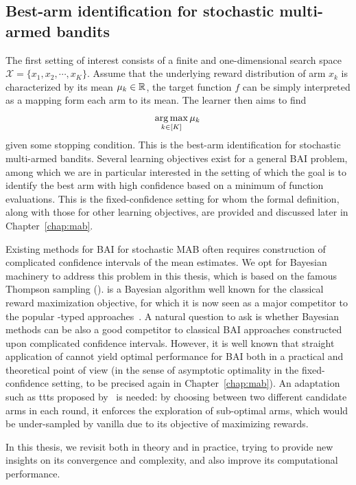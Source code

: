 \subsection{Best-arm identification for stochastic multi-armed bandits}

The first setting of interest consists of a finite and one-dimensional search space $\mathcal{X} = \{x_1,x_2,\cdots,x_K\}$. Assume that the underlying reward distribution of arm $x_k$ is characterized by its mean $\mu_k\in\mathbb{R}$, the target function $f$ can be simply interpreted as a mapping form each arm to its mean. The learner then aims to find
\begin{align}\label{eq:optim_bai}
    \operatorname*{arg\,max}_{k\in[K]} \mu_k\,
\end{align}
given some stopping condition. This is the best-arm identification for stochastic multi-armed bandits. Several learning objectives exist for a general BAI problem, among which we are in particular interested in the setting of which the goal is to identify the best arm with high confidence based on a minimum of function evaluations. This is the \gls{fixed-confidence setting} for whom the formal definition, along with those for other learning objectives, are provided and discussed later in Chapter~\ref{chap:mab}.

Existing methods for BAI for stochastic MAB often requires construction of complicated confidence intervals of the mean estimates. We opt for Bayesian machinery to address this problem in this thesis, which is based on the famous Thompson sampling (\TS). \TS is a Bayesian algorithm well known for the classical reward maximization objective, for which it is now seen as a major competitor to the popular \UCB-typed approaches~\citep{auer2002ucb}. A natural question to ask is whether Bayesian methods can be also a good competitor to classical BAI approaches constructed upon complicated confidence intervals. However, it is well known that straight application of \TS cannot yield optimal performance for BAI both in a practical and theoretical point of view (in the sense of \gls{asymptotic optimality} in the fixed-confidence setting, to be precised again in Chapter~\ref{chap:mab}). An adaptation such as \gls{ttts} proposed by~\cite{russo2016ttts} is needed: by choosing between two different candidate arms in each round, it enforces the exploration of sub-optimal arms, which would be under-sampled by vanilla \TS due to its objective of maximizing rewards. 

In this thesis, we revisit \TTTS both in theory and in practice, trying to provide new insights on its convergence and complexity, and also improve its computational performance.

